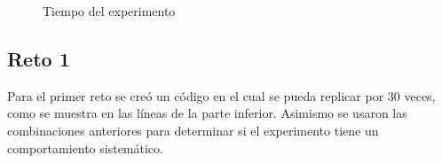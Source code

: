 \documentclass[12pt, letterpaper] {article}
\begin{document}
\begin{figure}[H]
\centering
{}\vspace{1mm}
\caption{Tiempo del experimento}\label{GF}
\end{figure}


\subsection{Reto 1}

Para el primer reto se creó un código en el cual se pueda replicar por 30 veces, como se muestra en las líneas de la parte inferior. Asimismo se usaron las combinaciones anteriores para determinar si el experimento tiene un comportamiento sistemático.
\end{document}
